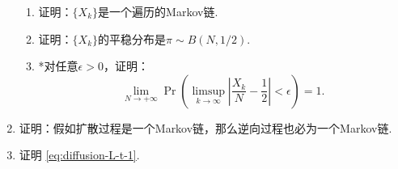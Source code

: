 \begin{enumerate}[wide, labelindent=0pt]
    \begin{enumerate}
        \item 证明：$\{X_k\}$是一个遍历的Markov链.
        \item 证明：$\{X_k\}$的平稳分布是$\pi\sim B(N,1/2)$.
        \item *对任意$\epsilon>0$，证明：
        \[
            \lim_{N\to+\infty}\Pr\left(\limsup_{k\to\infty}\left|\frac{X_k}{N}-\frac{1}{2}\right|<\epsilon\right)=1.
        \]
    \end{enumerate}

    \item \label{exercise:diffusion-well-defined} 证明：假如扩散过程是一个Markov链，那么逆向过程也必为一个Markov链.
    
    \item \label{exercise:diffusion-L-t-1} 证明 \eqref{eq:diffusion-L-t-1}.
    
\end{enumerate}